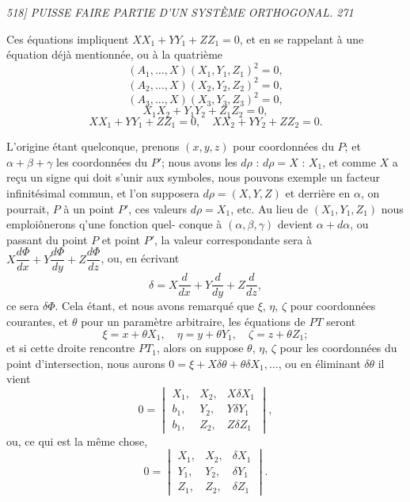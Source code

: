 \documentclass[11pt,a4paper]{book}
\begin{document}
\clearpage

\noindent\textit{518] \hfill PUISSE FAIRE PARTIE D'UN SYST\`EME ORTHOGONAL. \hfill 271}

\medskip

Ces \'equations impliquent $X X_1 + Y Y_1 + Z Z_1 = 0$, et en se rappelant \`a une \'equation
d\'ej\`a mentionn\'ee, ou \`a la quatri\`eme
\[
(A_1, \ldots, X)(X_1, Y_1, Z_1)^2 = 0,
\]
\[
(A_2, \ldots, X)(X_2, Y_2, Z_2)^2 = 0,
\]
\[
(A_3, \ldots, X)(X_3, Y_3, Z_3)^2 = 0,
\]
\[
X_1 X_2 + Y_1 Y_2 + Z_1 Z_2 = 0,
\]
\[
X X_1 + Y Y_1 + Z Z_1 = 0, \quad X X_2 + Y Y_2 + Z Z_2 = 0.
\]

L'origine \'etant quelconque, prenons $(x, y, z)$ pour coordonn\'ees du $P$; et $\alpha + \beta + \gamma$
les coordonn\'ees du $P'$; nous avons les $d\rho$ : $d\rho = X$ : $X_1$, et comme $X$ a re\c{c}u un signe
qui doit s'unir aux symboles, nous pouvons exemple un facteur infinit\'esimal commun, et
l'on supposera $d\rho = (X, Y, Z)$ et derri\`ere en $\alpha$, on pourrait, $P$ \`a un point $P'$, ces valeurs
$d\rho = X_1$, etc. Au lieu de $(X_1, Y_1, Z_1)$ nous emploi\^onerons q'une fonction quel-
conque \`a $(\alpha, \beta, \gamma)$ devient $\alpha + d\alpha$, ou passant du point $P$ et point $P'$, la valeur
correspondante sera \`a $X\dfrac{d\Phi}{dx} + Y\dfrac{d\Phi}{dy} + Z\dfrac{d\Phi}{dz}$, ou, en \'ecrivant
\[
\delta = X\frac{d}{dx} + Y\frac{d}{dy} + Z\frac{d}{dz},
\]
ce sera $\delta\Phi$. Cela \'etant, et nous avons remarqu\'e que $\xi$, $\eta$, $\zeta$ pour coordonn\'ees courantes,
et $\theta$ pour un param\`etre arbitraire, les \'equations de $PT$ seront
\[
\xi = x + \theta X_1, \quad \eta = y + \theta Y_1, \quad \zeta = z + \theta Z_1;
\]
et si cette droite rencontre $PT_1$, alors on suppose $\theta$, $\eta$, $\zeta$ pour les coordonn\'ees du
point d'intersection, nous aurons $0 = \xi + X\delta\theta + \theta\delta X_1, \ldots$, ou en \'eliminant $\delta\theta$ il
vient
\[
0 = \begin{vmatrix} X_1, & X_2, & X\delta X_1 \\ b_1, & Y_2, & Y\delta Y_1 \\ b_1, & Z_2, & Z\delta Z_1 \end{vmatrix},
\]
ou, ce qui est la m\^eme chose,
\[
0 = \begin{vmatrix} X_1, & X_2, & \delta X_1 \\ Y_1, & Y_2, & \delta Y_1 \\ Z_1, & Z_2, & \delta Z_1 \end{vmatrix}.
\]
\end{document}
